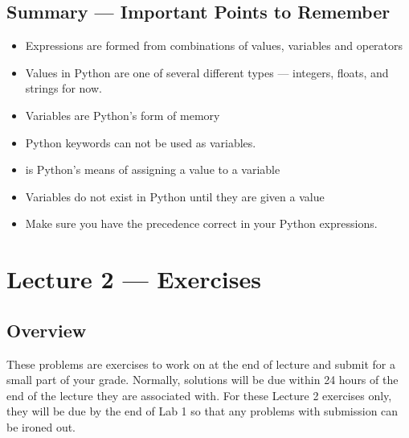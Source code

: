 \documentclass[letterpaper,10pt,english]{sphinxmanual}
\begin{document}
\begin{enumerate}
\end{enumerate}


\section{Summary — Important Points to Remember}
\label{\detokenize{lecture_notes/lec02_calculator:summary-important-points-to-remember}}\begin{itemize}
\item {} 
Expressions are formed from combinations of values, variables and
operators

\item {} 
Values in Python are one of several different types — integers,
floats, and strings for now.

\item {} 
Variables are Python’s form of memory

\item {} 
Python keywords can not be used as variables.

\item {} 
\sphinxcode{\sphinxupquote{=}} is Python’s means of assigning a value to a variable

\item {} 
Variables do not exist in Python until they are given a value

\item {} 
Make sure you have the precedence correct in your Python expressions.

\end{itemize}


\chapter{Lecture 2 — Exercises}
\label{\detokenize{lecture_notes/lec02_calculator_exercises/exercises:lecture-2-exercises}}\label{\detokenize{lecture_notes/lec02_calculator_exercises/exercises::doc}}

\section{Overview}
\label{\detokenize{lecture_notes/lec02_calculator_exercises/exercises:overview}}
These problems are exercises to work on at the end of lecture and
submit for a small part of your grade.  Normally, solutions will be
due within 24 hours of the end of the lecture they are associated
with.  For these Lecture 2 exercises only, they will be due by the end
of Lab 1 so that any problems with submission can be ironed out.
\end{document}
